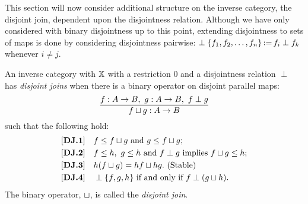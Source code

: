 This section will now consider additional structure on the inverse category, the disjoint join,
dependent upon the disjointness relation. Although we have only considered with binary disjointness
up to this point, extending disjointness to sets of maps is done by considering disjointness
pairwise: $\perp \{f_1,f_2,\ldots,f_n\} \operatorname*{:\!=} f_i \perp f_k$ whenever $i \ne j$.

\begin{definition}\label{def:disjoint_join}
  An inverse category with $\mathbb{X}$ with a restriction $0$ and a disjointness relation $\perp$ has
  \emph{disjoint joins} when there is a binary operator on disjoint parallel maps:
  \[
    \infer{f \djoin g : A \to B}{f: A\to B,\ g: A\to B,\ f \perp g}
  \]
  such that the following hold:
  \begin{align*}
    \axiom{DJ}{1}\quad & f \le f \djoin g\text{ and }g \le f \djoin g; \\
    \axiom{DJ}{2}\quad & f \le h,\ g \le h\text{ and }f\perp g\text{ implies }f \djoin g \le h;\\
    \axiom{DJ}{3}\quad & h(f \djoin g) = h f \djoin h g. \text{ (Stable)} \\
    \axiom{DJ}{4}\quad & \cdperp \{f, g, h\}\text{ if and only if }f \perp (g\djoin h).\\
  \end{align*}
  The binary operator, $\sqcup$, is called the \emph{disjoint join}.
\end{definition}

